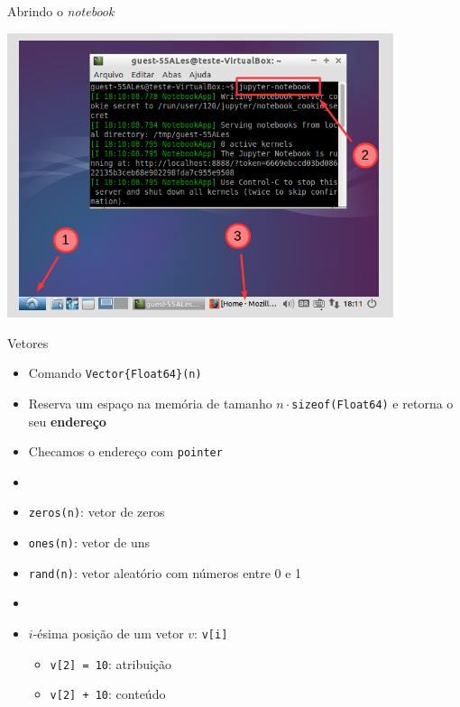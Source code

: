 \documentclass[]{beamer}
\newcommand{\code}[1]{\colorbox[gray]{0.8}{\texttt{#1}}}
\begin{document}
\begin{frame}{Abrindo o \textit{notebook}}

  \begin{center}
    \includegraphics[width=0.85\textwidth]{figures/notebook.png}
  \end{center}

\end{frame}

\begin{frame}[fragile]{Vetores}

  \begin{itemize}
  \item Comando \code{Vector\{Float64\}(n)}

  \item Reserva um espaço na memória de tamanho
    $n \cdot$\verb+sizeof(Float64)+ e retorna o seu \textbf{endereço}

  \item Checamos o endereço com \code{pointer}

  \item[]

  \item \code{zeros(n)}: vetor de zeros
  \item \code{ones(n)}: vetor de uns
  \item \code{rand(n)}: vetor aleatório com números entre 0 e 1

  \item[]

  \item $i$-ésima posição de um vetor $v$: \code{v[i]}
    
    \begin{itemize}
    \item \code{v[2] = 10}: atribuição
    \item \code{v[2] + 10}: conteúdo
    \end{itemize}

  \end{itemize}
  
\end{frame}
\end{document}
